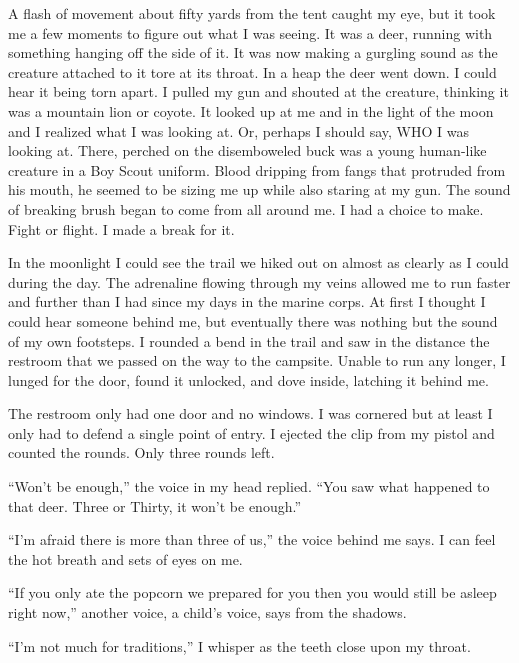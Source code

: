 A flash of movement about fifty yards from the tent caught my eye,
but it took me a few moments to figure out what I was seeing. It
was a deer, running with something hanging off the side of it. It
was now making a gurgling sound as the creature attached to it tore
at its throat. In a heap the deer went down. I could hear it being
torn apart. I pulled my gun and shouted at the creature, thinking
it was a mountain lion or coyote. It looked up at me and in the
light of the moon and I realized what I was looking at. Or, perhaps
I should say, WHO I was looking at. There, perched on the
disemboweled buck was a young human-like creature in a Boy Scout
uniform. Blood dripping from fangs that protruded from his mouth,
he seemed to be sizing me up while also staring at my gun. The
sound of breaking brush began to come from all around me. I had a
choice to make. Fight or flight. I made a break for it.



In the moonlight I could see the trail we hiked out on almost as
clearly as I could during the day. The adrenaline flowing through
my veins allowed me to run faster and further than I had since my
days in the marine corps. At first I thought I could hear someone
behind me, but eventually there was nothing but the sound of my own
footsteps. I rounded a bend in the trail and saw in the distance
the restroom that we passed on the way to the campsite. Unable to
run any longer, I lunged for the door, found it unlocked, and dove
inside, latching it behind me.



The restroom only had one door and no windows. I was cornered but
at least I only had to defend a single point of entry. I ejected
the clip from my pistol and counted the rounds. Only three rounds
left.



``Won't be enough,'' the voice in my head replied. ``You saw what
happened to that deer. Three or Thirty, it won't be enough.''



``I'm afraid there is more than three of us,'' the voice behind me
says. I can feel the hot breath and sets of eyes on me.



``If you only ate the popcorn we prepared for you then you would
still be asleep right now,'' another voice, a child's voice, says
from the shadows.



``I'm not much for traditions,'' I whisper as the teeth close upon my
throat. 
 



